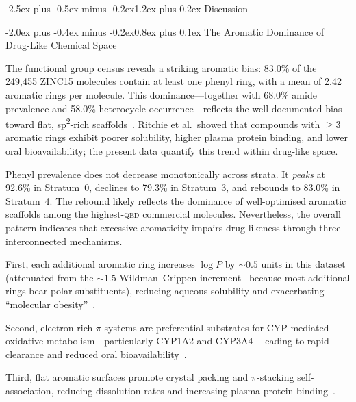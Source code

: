\documentclass[10pt,a4paper,twocolumn]{article}
\makeatletter
\providecommand{\qed}{}
\let\qed\relax
\newcommand{\qedscore}{\textsc{qed}}
\let\qed\qedscore
\newcommand{\logp}{\ensuremath{\log P}}
\renewcommand\section{\@startsection{section}{1}{\z@}%
  {-2.5ex plus -0.5ex minus -0.2ex}{1.2ex plus 0.2ex}%
  {\normalfont\Large\bfseries}}
\renewcommand\subsection{\@startsection{subsection}{2}{\z@}%
  {-2.0ex plus -0.4ex minus -0.2ex}{0.8ex plus 0.1ex}%
  {\normalfont\large\bfseries}}
\makeatother
\begin{document}
\section{Discussion}
\label{sec:discussion}

\subsection{The Aromatic Dominance of Drug-Like Chemical Space}

The functional group census reveals a striking aromatic bias: 83.0\% of the 249,455 ZINC15 molecules contain at least one phenyl ring, with a mean of 2.42 aromatic rings per molecule. This dominance---together with 68.0\% amide prevalence and 58.0\% heterocycle occurrence---reflects the well-documented bias toward flat, sp\textsuperscript{2}-rich scaffolds~\cite{ritchie2011}. Ritchie et al.\ showed that compounds with $\geq$3 aromatic rings exhibit poorer solubility, higher plasma protein binding, and lower oral bioavailability; the present data quantify this trend within drug-like space.

Phenyl prevalence does not decrease monotonically across strata. It \emph{peaks} at 92.6\% in Stratum~0, declines to 79.3\% in Stratum~3, and rebounds to 83.0\% in Stratum~4. The rebound likely reflects the dominance of well-optimised aromatic scaffolds among the highest-\qed{} commercial molecules. Nevertheless, the overall pattern indicates that excessive aromaticity impairs drug-likeness through three interconnected mechanisms.

First, each additional aromatic ring increases $\logp{}$ by ${\sim}0.5$ units in this dataset (attenuated from the ${\sim}1.5$ Wildman--Crippen increment~\cite{wildman1999} because most additional rings bear polar substituents), reducing aqueous solubility and exacerbating ``molecular obesity''~\cite{hann2012}.

Second, electron-rich $\pi$-systems are preferential substrates for CYP-mediated oxidative metabolism---particularly CYP1A2 and CYP3A4---leading to rapid clearance and reduced oral bioavailability~\cite{obach2008}.

Third, flat aromatic surfaces promote crystal packing and $\pi$-stacking self-association, reducing dissolution rates and increasing plasma protein binding~\cite{ritchie2011}.
\end{document}

